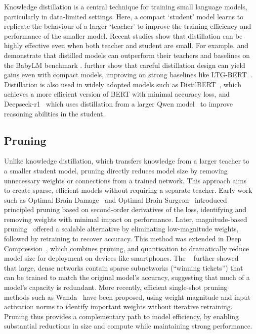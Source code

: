Knowledge distillation is a central technique for training small language models, particularly in data-limited settings. Here, a compact `student' model learns to replicate the behaviour of a larger `teacher' to improve the training efficiency and performance of the smaller model.
Recent studies show that distillation can be highly effective even when both teacher and student are small. For example, \citet{timiryasov2023baby} and \citet{tastet2024babyllama2} demonstrate that distilled models can outperform their teachers and baselines on the BabyLM benchmark \citep{warstadt2023babylm1, conll2024babylm2}. \citet{yam2024tinyminds} further show that careful distillation design can yield gains even with compact models, improving on strong baselines like LTG-BERT~\citep{samuel2023ltgbert}.
Distillation is also used in widely adopted models such as DistilBERT~\citep{sanh2019distilbert}, which achieves a more efficient version of BERT with minimal accuracy loss, and Deepseek-r1~\citep{guo2025deepseekr1} which uses distillation from a larger Qwen model~\citep{alibaba2023qwen} to improve reasoning abilities in the student.

\subsection{Pruning}

Unlike knowledge distillation, which transfers knowledge from a larger teacher to a smaller student model, pruning directly reduces model size by removing unnecessary weights or connections from a trained network. This approach aims to create sparse, efficient models without requiring a separate teacher.
Early work such as Optimal Brain Damage~\citep{lecun1990optimal} and Optimal Brain Surgeon~\citep{hassibi1993optimal} introduced principled pruning based on second-order derivatives of the loss, identifying and removing weights with minimal impact on performance. Later, magnitude-based pruning~\citep{han2015learning} offered a scalable alternative by eliminating low-magnitude weights, followed by retraining to recover accuracy. This method was extended in Deep Compression~\citep{han2016deep}, which combines pruning, and quantisation to dramatically reduce model size for deployment on devices like smartphones.
The ~\citep{frankle2019lottery} further showed that large, dense networks contain sparse subnetworks (“winning tickets”) that can be trained to match the original model's accuracy, suggesting that much of a model's capacity is redundant. More recently, efficient single-shot pruning methods such as Wanda~\citep{sun2024simple} have been proposed, using weight magnitude and input activation norms to identify important weights without iterative retraining.
Pruning thus provides a complementary path to model efficiency, by enabling substantial reductions in size and compute while maintaining strong performance.

